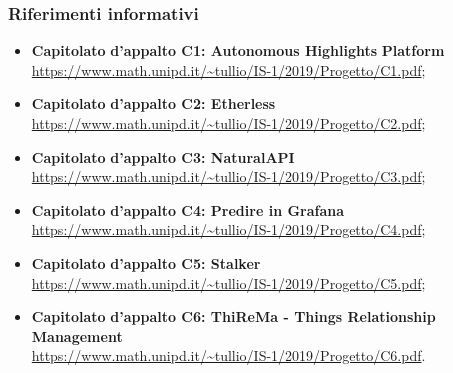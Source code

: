 	\subsubsection{Riferimenti informativi}
	\begin{itemize}
		\item \textbf{Capitolato}\textbf{ d'appalto C1: Autonomous Highlights}\textbf{ Platform} \\ 			\url{https://www.math.unipd.it/~tullio/IS-1/2019/Progetto/C1.pdf};
		
		\item \textbf{Capitolato}\textbf{ d'appalto C2: Etherless} \\ 			\url{https://www.math.unipd.it/~tullio/IS-1/2019/Progetto/C2.pdf};
		
		\item \textbf{Capitolato}\textbf{ d'appalto C3: NaturalAPI} \\ 			\url{https://www.math.unipd.it/~tullio/IS-1/2019/Progetto/C3.pdf};
		
		\item \textbf{Capitolato}\textbf{ d'appalto C4: Predire in Grafana} \\ 			\url{https://www.math.unipd.it/~tullio/IS-1/2019/Progetto/C4.pdf};
		
		\item \textbf{Capitolato}\textbf{ d'appalto C5: Stalker} \\ 			\url{https://www.math.unipd.it/~tullio/IS-1/2019/Progetto/C5.pdf};
		
		\item \textbf{Capitolato}\textbf{ d'appalto C6: ThiReMa - Things Relationship Management} \\ 			\url{https://www.math.unipd.it/~tullio/IS-1/2019/Progetto/C6.pdf}.	
	\end{itemize}